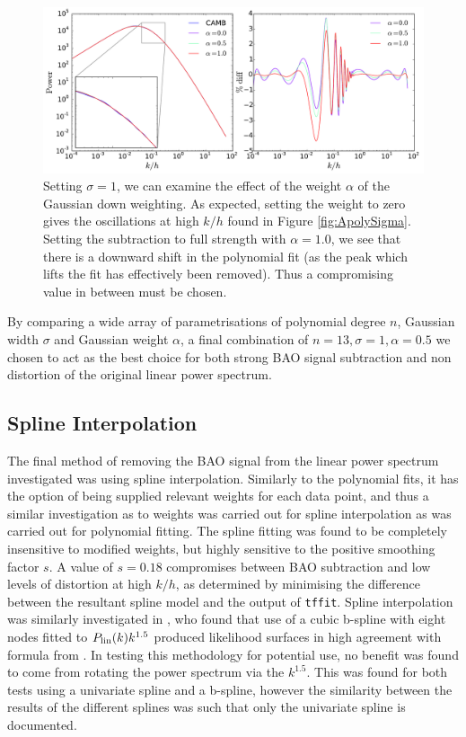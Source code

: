\documentclass[titlesmallcaps, examinerscopy, copyrightpage]{uqthesis}
\begin{document}
\begin{appendices}
\begin{figure}[h]
  \begin{center}
    \includegraphics[width=\textwidth]{images/ApolyWeight.pdf}
  	\caption{Setting $\sigma = 1$, we can examine the effect of the weight $\alpha$ of the Gaussian down weighting. As expected, setting the weight to zero gives the oscillations at high $k/h$ found in Figure \ref{fig:ApolySigma}. Setting the subtraction to full strength with $\alpha = 1.0$, we see that there is a downward shift in the polynomial fit (as the peak which lifts the fit has effectively been removed). Thus a compromising value in between must be chosen.}
  	\label{fig:ApolyWeight}
  \end{center}
\end{figure}


By comparing a wide array of parametrisations of polynomial degree $n$, Gaussian width $\sigma$ and Gaussian weight $\alpha$, a final combination of $n=13, \sigma=1, \alpha=0.5$ we chosen to act as the best choice for both strong BAO signal subtraction and non distortion of the original linear power spectrum.

\subsection{Spline Interpolation}


The final method of removing the BAO signal from the linear power spectrum investigated was using spline interpolation. Similarly to the polynomial fits, it has the option of being supplied relevant weights for each data point, and thus a similar investigation as to weights was carried out for spline interpolation as was carried out for polynomial fitting. The spline fitting was found to be completely insensitive to modified weights, but highly sensitive to the positive smoothing factor $s$. A value of $s = 0.18$ compromises between BAO subtraction and low levels of distortion at high $k/h$, as determined by minimising the difference between the resultant spline model and the output of \verb;tffit;. Spline interpolation was similarly investigated in \citet{ReidPercival2010}, who found that use of a cubic b-spline with eight nodes fitted to $P_{\rm{lin}}(k) k^{1.5}$ produced likelihood surfaces in high agreement with formula from \citet{EisensteinHu1998}. In testing this methodology for potential use, no benefit was found to come from rotating the power spectrum via the $k^{1.5}$. This was found for both tests using a univariate spline and a b-spline, however the similarity between the results of the different splines was such that only the univariate spline is documented.



\end{appendices}
\end{document}
